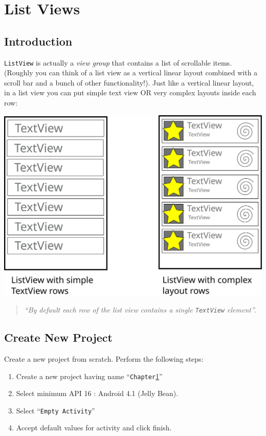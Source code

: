 \chapter{List Views}
\label{LV}

\section{Introduction}
\label{LV:introduction}
\texttt{ListView} is actually a \textit{view group} that contains a list of scrollable items. (Roughly you can think of a list view as a vertical linear layout combined with a scroll bar and a bunch of other functionality!). Just like a vertical linear layout, in a list view you can put simple text view OR very complex layouts inside each row:

\begin{center}
	\includegraphics[scale=0.35]{chapters/ch10/images/1}
\end{center}

\begin{quote}
	\textit{``By default each row of the list view contains a single \texttt{TextView} element''.}
\end{quote}

\section{Create New Project}
\label{LV:createProj}

Create a new project from scratch. Perform the following steps:
\begin{enumerate}
	\item Create a new project having name ``\texttt{Chapter\ref{LV}}''
	\item Select minimum API 16 : Android 4.1 (Jelly Bean).
	\item Select ``\texttt{Empty Activity}''
	\item Accept default values for activity and click finish. \\
\end{enumerate}

